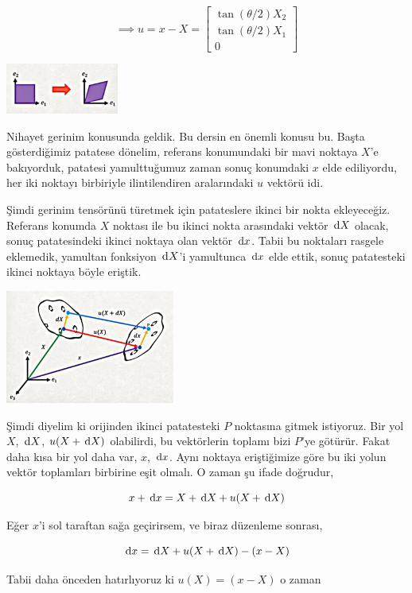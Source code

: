 \documentclass[12pt,fleqn]{article}\usepackage{../../common}
\begin{document}
$$
\implies u = x - X =
\left[\begin{array}{ccc}
\tan(\theta / 2) X_2 \\
\tan(\theta / 2) X_1 \\
0
\end{array}\right]
$$

\includegraphics[width=10em]{phy_020_strs_01_08.jpg}

Nihayet gerinim konusunda geldik. Bu dersin en önemli konusu bu. Başta
gösterdiğimiz patatese dönelim, referans konumundaki bir mavi noktaya $X$'e
bakıyorduk, patatesi yamulttuğumuz zaman sonuç konumdaki $x$ elde ediliyordu,
her iki noktayı birbiriyle ilintilendiren aralarındaki $u$ vektörü idi.

Şimdi gerinim tensörünü türetmek için patateslere ikinci bir nokta
ekleyeceğiz. Referans konumda $X$ noktası ile bu ikinci nokta arasındaki vektör
$\,\mathrm{d} X$ olacak, sonuç patatesindeki ikinci noktaya olan vektör $\,\mathrm{d} x$.  Tabii
bu noktaları rasgele eklemedik, yamultan fonksiyon $\,\mathrm{d} X$'i yamultunca $\,\mathrm{d} x$
elde ettik, sonuç patatesteki ikinci noktaya böyle eriştik.

\includegraphics[width=15em]{phy_020_strs_01_09.jpg}

Şimdi diyelim ki orijinden ikinci patatesteki $P$ noktasına gitmek
istiyoruz. Bir yol $X$, $\,\mathrm{d} X$, $u(X+\,\mathrm{d} X)$ olabilirdi, bu vektörlerin toplamı
bizi $P$'ye götürür. Fakat daha kısa bir yol daha var, $x$, $\,\mathrm{d} x$. Aynı
noktaya eriştiğimize göre bu iki yolun vektör toplamları birbirine eşit olmalı.
O zaman şu ifade doğrudur,

$$
x + \,\mathrm{d} x = X + \,\mathrm{d} X + u(X+\,\mathrm{d} X)
$$

Eğer $x$'i sol taraftan sağa geçirirsem, ve biraz düzenleme sonrası,

$$
\,\mathrm{d} x = \,\mathrm{d} X + u(X+\,\mathrm{d} X) - (x - X)
$$

Tabii daha önceden hatırlıyoruz ki $u(X) = (x - X)$ o zaman 
\end{document}
